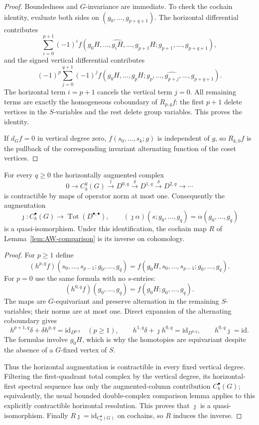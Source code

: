 \begin{proof}
Boundedness and $G$-invariance are immediate.
To check the cochain identity, evaluate both sides on
$(g_0,\ldots,g_{p+q+1})$. The horizontal differential
contributes
\[
 \sum_{i=0}^{p+1}(-1)^i
 f(g_0H,\ldots,\widehat{g_iH},\ldots,g_{p+1}H;
   g_{p+1},\ldots,g_{p+q+1}),
\]
and the signed vertical differential contributes
\[
 (-1)^p\sum_{j=0}^{q+1}(-1)^j
 f(g_0H,\ldots,g_pH;
   g_p,\ldots,\widehat{g_{p+j}},\ldots,g_{p+q+1}).
\]
The horizontal term $i=p+1$ cancels the vertical
term $j=0$. All remaining terms are exactly
the homogeneous coboundary of $R_{p,q}f$:
the first $p+1$ delete vertices in the
$S$-variables and the rest delete group variables.
This proves the identity.

If $d_Gf=0$ in vertical degree zero,
$f(s_0,\ldots,s_k;g)$ is independent of $g$,
so $R_{k,0}f$ is the pullback of the corresponding
invariant alternating function of the coset vertices.
\end{proof}

\begin{lemma}\label{lem:horizontal-contraction}
For every $q\geq0$ the horizontally augmented
complex
\[
 0\longrightarrow C_b^q(G)
 \xrightarrow{\jmath}D^{0,q}
 \xrightarrow{\delta}D^{1,q}
 \xrightarrow{\delta}D^{2,q}\longrightarrow\cdots
\]
is contractible by maps of operator norm at most one.
Consequently the augmentation
\[
 \jmath:C_b^\bullet(G)\longrightarrow
          \operatorname{Tot}(D^{\bullet,\bullet}),
 \qquad (\jmath\alpha)(s;g_0,\ldots,g_q)
          =\alpha(g_0,\ldots,g_q)
\]
is a quasi-isomorphism. Under this identification,
the cochain map $R$ of Lemma~\ref{lem:AW-comparison}
is its inverse on cohomology.
\end{lemma}

\begin{proof}
For $p\geq1$ define
\[
 (h^{p,q}f)(s_0,\ldots,s_{p-1};
                         g_0,\ldots,g_q)
 =
 f(g_0H,s_0,\ldots,s_{p-1};g_0,\ldots,g_q).
\]
For $p=0$ use the same formula with no $s$-entries:
\[
 (h^{0,q}f)(g_0,\ldots,g_q)
 =f(g_0H;g_0,\ldots,g_q).
\]
The maps are $G$-equivariant and preserve alternation
in the remaining $S$-variables; their norms are at
most one. Direct expansion of the alternating
coboundary gives
\[
 h^{p+1,q}\delta+\delta h^{p,q}
 =\mathrm{id}_{D^{p,q}}\quad(p\geq1),
 \qquad
 h^{1,q}\delta+\jmath h^{0,q}
 =\mathrm{id}_{D^{0,q}},
 \qquad h^{0,q}\jmath=\mathrm{id}.
\]
The formulas involve $g_0H$, which is why
the homotopies are equivariant despite the
absence of a $G$-fixed vertex of $S$.

Thus the horizontal augmentation is contractible
in every fixed vertical degree. Filtering the
first-quadrant total complex by the vertical
degree, its horizontal-first spectral sequence
has only the augmented-column contribution
$C_b^\bullet(G)$; equivalently, the usual
bounded double-complex comparison lemma
applies to this explicitly contractible
horizontal resolution. This proves that $\jmath$
is a quasi-isomorphism. Finally
$R\jmath=\mathrm{id}_{C_b^\bullet(G)}$
on cochains, so $R$ induces the inverse.
\end{proof}

